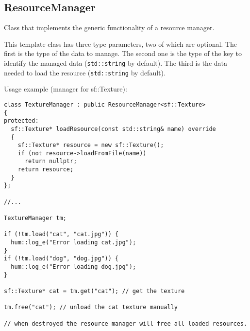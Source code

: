 \subsection{ResourceManager}
Class that implements the generic functionality of a resource manager.

This template class has three type parameters, two of which are optional. The
first is the type of the data to manage. The second one is the type of the
key to identify the managed data (\texttt{std::string} by default). The third is the data needed to load the
resource (\texttt{std::string} by default).

Usage example (manager for sf::Texture):
\begin{lstlisting}[caption=ResourceManager example]
class TextureManager : public ResourceManager<sf::Texture>
{
protected:
  sf::Texture* loadResource(const std::string& name) override
  {
    sf::Texture* resource = new sf::Texture();
    if (not resource->loadFromFile(name))
      return nullptr;
    return resource;
  }
};

//...

TextureManager tm;

if (!tm.load("cat", "cat.jpg")) {
  hum::log_e("Error loading cat.jpg");
}
if (!tm.load("dog", "dog.jpg")) {
  hum::log_e("Error loading dog.jpg");
}

sf::Texture* cat = tm.get("cat"); // get the texture

tm.free("cat"); // unload the cat texture manually

// when destroyed the resource manager will free all loaded resources.

\end{lstlisting}
